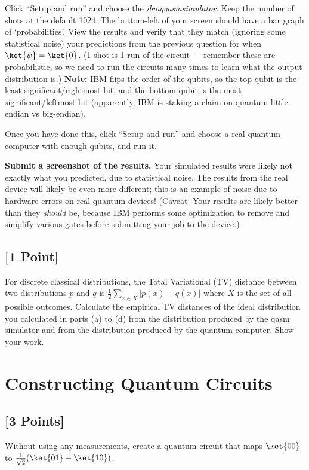 \documentclass[11pt]{article}
\begin{document}
\st{Click ``Setup and run'' and choose the \emph{ibmq\textunderscore qasm\textunderscore simulator}. Keep the number of shots at the default 1024.} The bottom-left of your screen should have a bar graph of `probabilities'. View the results and verify that they match (ignoring some statistical noise) your predictions from the previous question for when $\ket{\psi} = \ket{0}$.  
(1 shot is 1 run of the circuit --- remember these are probabilistic, so we need to run the circuits many times to learn what the output distribution is.)
\textbf{Note:} IBM flips the order of the qubits, so the top qubit is the least-significant/rightmost bit, and the bottom qubit is the most-significant/leftmost bit (apparently, IBM is staking a claim on quantum little-endian vs big-endian).

Once you have done this, click ``Setup and run'' and choose a real quantum computer with enough qubits, and run it.

\textbf{Submit a screenshot of the results.} Your simulated results were likely not exactly what you predicted, due to statistical noise. The results from the real device will likely be even more different; this is an example of noise due to hardware errors on real quantum devices! 
(Caveat: Your results are likely better than they \textit{should} be, because IBM performs some optimization to remove and simplify various gates before submitting your job to the device.)

\subsection{[1 Point]}
For discrete classical distributions, the Total Variational (TV) distance between two distributions $p$ and $q$ is $\frac{1}{2}\sum_{x \in X} | p(x) - q(x)|$ where $X$ is the set of all possible outcomes. 
Calculate the empirical TV distances of the ideal distribution you calculated in parts (a) to (d) from the distribution produced by the qasm simulator and from the distribution produced by the quantum computer. Show your work.

\section{Constructing Quantum Circuits}

\subsection{[3 Points]} Without using any measurements, create a quantum circuit that maps $\ket{00}$ to $\frac{1}{\sqrt{2}}(\ket{01} - \ket{10})$.
\end{document}
